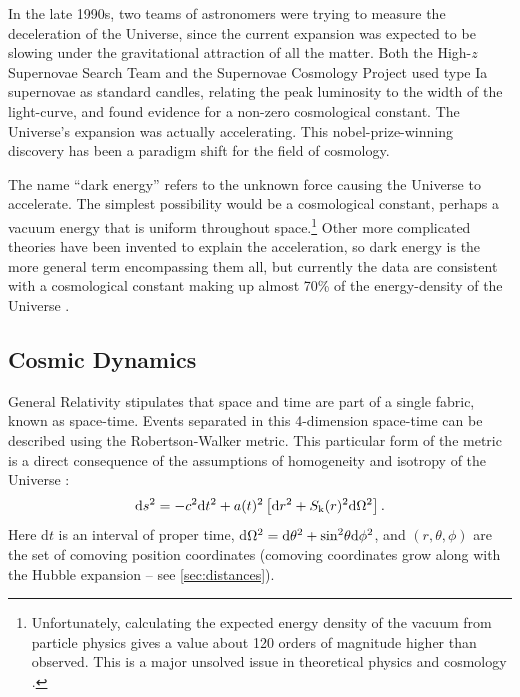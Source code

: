 In the late 1990s, two teams of astronomers were trying to measure the deceleration of the Universe, since the current expansion was expected to be slowing under the gravitational attraction of all the matter. Both the High-$z$ Supernovae Search Team \citep{Riess98} and the Supernovae Cosmology Project \citep{Perlmutter99} used type Ia supernovae as standard candles, relating the peak luminosity to the width of the light-curve, and found evidence for a non-zero cosmological constant. The Universe's expansion was actually accelerating. This nobel-prize-winning discovery has been a paradigm shift for the field of cosmology.

The name ``dark energy'' refers to the unknown force causing the Universe to accelerate. The simplest possibility would be a cosmological constant, perhaps a vacuum energy that is uniform throughout space.\footnote{Unfortunately, calculating the expected energy density of the vacuum from particle physics gives a value about 120 orders of magnitude higher than observed. This is a major unsolved issue in theoretical physics and cosmology \citep{Weinberg13}.} Other more complicated theories have been invented to explain the acceleration, so dark energy is the more general term encompassing them all, but currently the data are consistent with a cosmological constant making up almost 70\% of the energy-density of the Universe \citep{PlanckXVI,PlanckDE15}.

\subsection{Cosmic Dynamics}
\label{sec:Dynamics}

General Relativity stipulates that space and time are part of a single fabric, known as space-time. Events separated in this 4-dimension space-time can be described using the Robertson-Walker metric. This particular form of the metric is a direct consequence of the assumptions of homogeneity and isotropy of the Universe \citep[e.g.][]{Bertone05}:
\begin{equation}
{\rm d}s^2 = -c^2 {\rm d}t^2 +a(t)^2 \left[{\rm d}r^2 + S_{\rm k}(r)^2{\rm d}\Omega^2\right].
\label{eq:metric}
\end{equation}
Here d$t$ is an interval of proper time, d$\Omega^2 = {\rm d}\theta^2 + {\rm sin}^2\theta {\rm d}\phi^2$, and $(r,\theta,\phi)$ are the set of comoving position coordinates (comoving coordinates grow along with the Hubble expansion -- see \autoref{sec:distances}). 

